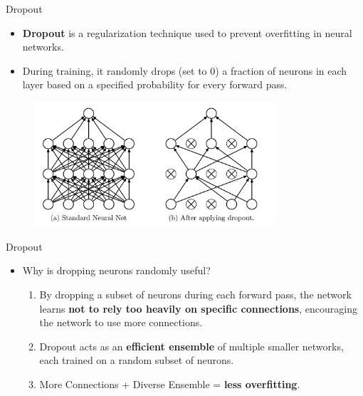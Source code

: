 \begin{frame}{Dropout}
    \begin{itemize}
    \item \textbf{Dropout} is a regularization technique used to prevent overfitting in neural networks.
    \item During training, it randomly drops (set to 0) a fraction of neurons in each layer based on a specified probability for every forward pass.
\end{itemize}
    \begin{figure}
    \centering
    \includegraphics[width=0.8\textwidth,height=0.8\textheight,keepaspectratio]{images/dropout_1.png}
    \end{figure}
\end{frame}

\begin{frame}{Dropout}
\begin{itemize}
    \item Why is dropping neurons randomly useful?
\begin{enumerate}
    \item By dropping a subset of neurons during each forward pass, the network learns \textbf{not to rely too heavily on specific connections}, encouraging the network to use more connections.
    \item Dropout acts as an \textbf{efficient ensemble} of multiple smaller networks, each trained on a random subset of neurons.
    \item More Connections + Diverse Ensemble = \textbf{less overfitting}.
\end{enumerate}
\end{itemize}
\end{frame}

